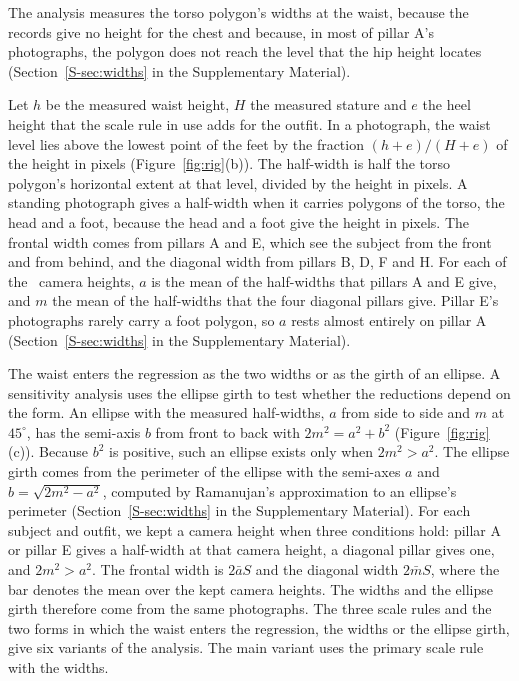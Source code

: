 \documentclass[12pt]{article}
\begin{document}
The analysis measures the torso polygon's widths at the waist, because the records give no height for the chest and
because, in most of pillar A's photographs, the polygon does not reach the level that the hip height locates
(Section~\ref{S-sec:widths} in the Supplementary Material).

Let $h$ be the measured waist height, $H$ the measured stature and $e$ the heel height that the scale rule in use adds
for the outfit. In a photograph, the waist level lies above the lowest point of the feet by the fraction
$(h + e)/(H + e)$ of the height in pixels (Figure~\ref{fig:rig}(b)). The half-width is half the torso polygon's
horizontal extent at that level, divided by the height in pixels. A standing photograph gives a half-width when it carries polygons of the torso, the head and a foot, because the head and a foot give the height in pixels. The frontal width comes
from pillars A and E, which see the subject from the front and from behind, and the diagonal width from pillars B, D,
F and H. For each of the \camerasPerPillar\ camera heights, $a$ is the mean of the half-widths that pillars A and E
give, and $m$ the mean of the half-widths that the four diagonal pillars give.  Pillar E's photographs rarely carry a foot polygon, so $a$ rests almost entirely on pillar A (Section~\ref{S-sec:widths} in the Supplementary Material). 

The waist enters the regression as the two widths or as the girth of an ellipse. A sensitivity analysis uses the
ellipse girth to test whether the reductions depend on the form. An ellipse with the measured half-widths, $a$ from side to side and $m$
at $45^\circ$, has the semi-axis $b$ from front to back with $2m^2 = a^2 + b^2$ (Figure~\ref{fig:rig}(c)). Because $b^2$ is positive, such an ellipse exists only when $2m^2 > a^2$. The ellipse girth comes from the perimeter of the ellipse with the semi-axes $a$ and $b = \sqrt{2m^2 - a^2}$, computed by Ramanujan's
approximation to an ellipse's perimeter\cite{ramanujan1914} (Section~\ref{S-sec:widths} in the Supplementary
Material). For each subject and outfit, we kept a camera height when three conditions hold: pillar A or pillar E gives
a half-width at that camera height, a diagonal pillar gives one, and $2m^2 > a^2$. The frontal width is $2\bar{a}S$ and the diagonal width
$2\bar{m}S$, where the bar denotes the mean over the kept camera heights. The widths and the ellipse girth therefore
come from the same photographs.
The three scale rules and the two forms in which the waist enters the regression, the widths or the
ellipse girth, give six variants of the analysis. The main variant uses the primary scale rule with the widths.
\end{document}
